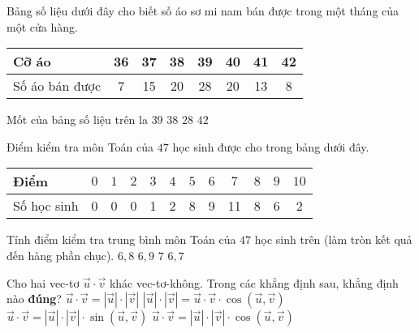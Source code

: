 \begin{ex}%
Bảng số liệu dưới đây cho biết số áo sơ mi nam bán được trong một tháng của một cửa hàng.
\begin{center}
\begin{tabular}{|l|c|c|c|c|c|c|c|}
\hline
Cỡ áo & 36 & 37 & 38 & 39 & 40 & 41 & 42\\
\hline
Số áo bán được & 7 & 15 & 20 & 28 & 20 & 13 & 8\\
\hline
\end{tabular}
\end{center}
Mốt của bảng số liệu trên la
\choice
{\True$39$}
{$38$}
{$28$}
{$42$}
\end{ex}

\begin{ex}%
Điểm kiểm tra môn Toán của $47$ học sinh được cho trong bảng dưới đây.
\begin{center}
\begin{tabular}{|l|c|c|c|c|c|c|c|c|c|c|c|}
\hline
Điểm& $0$& $1$ & $2$ & $3$ & $4$ & $5$ & $6$ & $7$ & $8$ & $9$ & $10$\\
\hline
Số học sinh& 0 & 0 & 0 & 1 & 2 & 8 & 9 & 11 & 8 & 6 & 2 \\
\hline
\end{tabular}
\end{center}
Tính điểm kiểm tra trung bình môn Toán của $47$ học sinh trên (làm tròn kết quả đến hàng phần chục).
\choice
{\True$6{,}8$}
{ $6{,}9$}
{$7$}
{$6{,}7$}
\end{ex}

\begin{ex}%
Cho hai vec-tơ $\vec{u}\cdot \vec{v}$ khác vec-tơ-không. Trong các khẳng định sau, khẳng định nào \textbf{đúng}?
\choice
{$\vec{u}\cdot \vec{v}=\left|\vec{u}\right|\cdot \left|\vec{v}\right|$}
{$\left|\vec{u}\right|\cdot \left|\vec{v}\right|=\vec{u}\cdot \vec{v}\cdot \cos \left(\vec{u},\vec{v}\right)$}
{$\vec{u}\cdot \vec{v}=\left|\vec{u}\right|\cdot \left|\vec{v}\right|\cdot \sin \left(\vec{u},\vec{v} \right)$}
{\True $\vec{u}\cdot \vec{v}=\left|\vec{u}\right|\cdot \left|\vec{v}\right|\cdot \cos \left(\vec{u},\vec{v} \right)$}
\end{ex}

